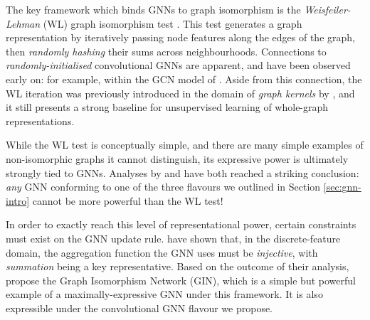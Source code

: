 The key framework which binds GNNs to graph isomorphism is the \emph{Weisfeiler-Lehman} (WL) graph isomorphism test \citep{weisfeiler1968reduction}. This test generates a graph representation by iteratively passing node features along the edges of the graph, then \emph{randomly hashing} their sums across neighbourhoods. Connections to \emph{randomly-initialised} convolutional GNNs are apparent, and have been observed early on: for example, within the GCN model of \citet{kipf2016semi}. Aside from this connection, the WL iteration was previously introduced in the domain of \emph{graph kernels} by \citet{shervashidze2011weisfeiler}, and it still presents a strong baseline for unsupervised learning of whole-graph representations.

While the WL test is conceptually simple, and there are many simple examples of non-isomorphic graphs it cannot distinguish, its expressive power is ultimately strongly tied to GNNs. Analyses by \citet{morris2019weisfeiler} and \citet{xu2018powerful} have both reached a striking conclusion: \emph{any} GNN conforming to one of the three flavours we outlined in Section \ref{sec:gnn-intro} cannot be more powerful than the WL test!

In order to exactly reach this level of representational power, certain constraints must exist on the GNN update rule. \citet{xu2018powerful} have shown that, in the discrete-feature domain, the aggregation function the GNN uses must be \emph{injective}, with \emph{summation} being a key representative. Based on the outcome of their analysis, \citet{xu2018powerful} propose the Graph Isomorphism Network (GIN), which is a simple but powerful example of a maximally-expressive GNN under this framework. It is also expressible under the convolutional GNN flavour we propose.

